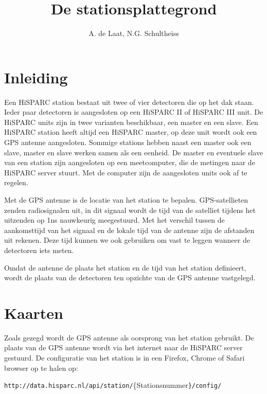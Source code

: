 



\title{De stationsplattegrond}


\author{A. de Laat, N.G. Schultheiss}

\maketitle

\section{Inleiding}

Een HiSPARC station bestaat uit twee of vier detectoren die op het
dak staan. Ieder paar detectoren is aangesloten op een HiSPARC II
of HiSPARC III unit. De HiSPARC units zijn in twee varianten beschikbaar,
een master en een slave. Een HiSPARC station heeft altijd een HiSPARC
master, op deze unit wordt ook een GPS antenne aangesloten. Sommige
stations hebben naast een master ook een slave, master en slave werken
samen als een eenheid. De master en eventuele slave van een station
zijn aangesloten op een meetcomputer, die de metingen naar de HiSPARC
server stuurt. Met de computer zijn de aangesloten units ook af te
regelen.

Met de GPS antenne is de locatie van het station te bepalen. GPS-satellieten
zenden radiosignalen uit, in dit signaal wordt de tijd van de satelliet
tijdens het uitzenden op 1ns nauwkeurig meegestuurd. Met het verschil
tussen de aankomsttijd van het signaal en de lokale tijd van de antenne
zijn de afstanden uit rekenen. Deze tijd kunnen we ook gebruiken om
vast te leggen wanneer de detectoren iets meten. 

Omdat de antenne de plaats het station en de tijd van het station
definieert, wordt de plaats van de detectoren ten opzichte van de
GPS antenne vastgelegd.


\section{Kaarten}

Zoals gezegd wordt de GPS antenne als oorsprong van het station gebruikt.
De plaats van de GPS antenne wordt via het internet naar de HiSPARC
server gestuurd. De configuratie van het station is in een Firefox,
Chrome of Safari browser op te halen op: 

\texttt{\small{http://data.hisparc.nl/api/station/}}{\small{\{Stationsnummer}}\texttt{\small{\}/config/}}{\small \par}


